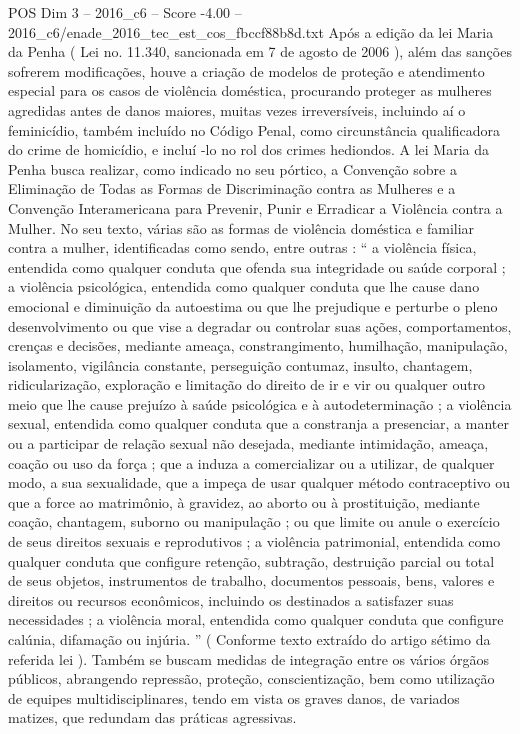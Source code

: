 \begin{textsample}{POS Dim 3 – 2016\_c6 – Score -4.00 – 2016\_c6/enade\_2016\_tec\_est\_cos\_fbccf88b8d.txt}
Após a edição da lei Maria da Penha ( Lei no. 11.340, sancionada em 7 de agosto de 2006 ), além das sanções sofrerem modificações, houve a criação de modelos de proteção e atendimento especial para os casos de violência doméstica, procurando proteger as mulheres agredidas antes de danos maiores, muitas vezes irreversíveis, incluindo aí o feminicídio, também incluído no Código Penal, como circunstância qualificadora do crime de homicídio, e incluí -lo no rol dos crimes hediondos.
A lei Maria da Penha busca realizar, como indicado no seu pórtico, a Convenção sobre a Eliminação de Todas as Formas de Discriminação contra as Mulheres e a Convenção Interamericana para Prevenir, Punir e Erradicar a Violência contra a Mulher.
No seu texto, várias são as formas de violência doméstica e familiar contra a mulher, identificadas como sendo, entre outras : “ a violência física, entendida como qualquer conduta que ofenda sua integridade ou saúde corporal ; a violência psicológica, entendida como qualquer conduta que lhe cause dano emocional e diminuição da autoestima ou que lhe prejudique e perturbe o pleno desenvolvimento ou que vise a degradar ou controlar suas ações, comportamentos, crenças e decisões, mediante ameaça, constrangimento, humilhação, manipulação, isolamento, vigilância constante, perseguição contumaz, insulto, chantagem, ridicularização, exploração e limitação do direito de ir e vir ou qualquer outro meio que lhe cause prejuízo à saúde psicológica e à autodeterminação ; a violência sexual, entendida como qualquer conduta que a constranja a presenciar, a manter ou a participar de relação sexual não desejada, mediante intimidação, ameaça, coação ou uso da força ; que a induza a comercializar ou a utilizar, de qualquer modo, a sua sexualidade, que a impeça de usar qualquer método contraceptivo ou que a force ao matrimônio, à gravidez, ao aborto ou à prostituição, mediante coação, chantagem, suborno ou manipulação ; ou que limite ou anule o exercício de seus direitos sexuais e reprodutivos ; a violência patrimonial, entendida como qualquer conduta que configure retenção, subtração, destruição parcial ou total de seus objetos, instrumentos de trabalho, documentos pessoais, bens, valores e direitos ou recursos econômicos, incluindo os destinados a satisfazer suas necessidades ; a violência moral, entendida como qualquer conduta que configure calúnia, difamação ou injúria. ” ( Conforme texto extraído do artigo sétimo da referida lei ).
Também se buscam medidas de integração entre os vários órgãos públicos, abrangendo repressão, proteção, conscientização, bem como utilização de equipes multidisciplinares, tendo em vista os graves danos, de variados matizes, que redundam das práticas agressivas.

\end{textsample}
